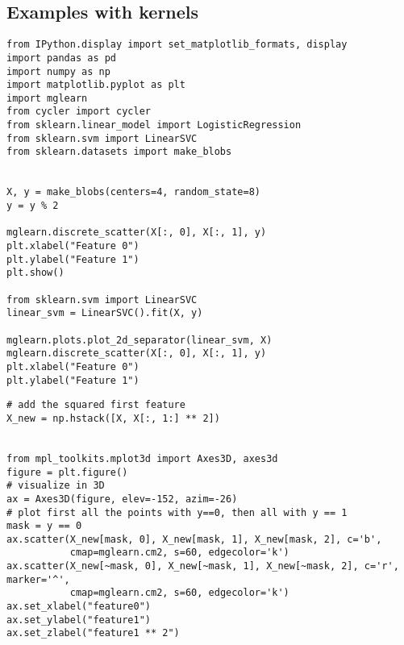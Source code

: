 \documentclass[%
oneside,                 %
final,                   %
10pt]{article}
\begin{document}
\subsection*{Examples with kernels}

\begin{verbatim}
from IPython.display import set_matplotlib_formats, display
import pandas as pd
import numpy as np
import matplotlib.pyplot as plt
import mglearn
from cycler import cycler
from sklearn.linear_model import LogisticRegression
from sklearn.svm import LinearSVC
from sklearn.datasets import make_blobs


X, y = make_blobs(centers=4, random_state=8)
y = y % 2

mglearn.discrete_scatter(X[:, 0], X[:, 1], y)
plt.xlabel("Feature 0")
plt.ylabel("Feature 1")
plt.show()

from sklearn.svm import LinearSVC
linear_svm = LinearSVC().fit(X, y)

mglearn.plots.plot_2d_separator(linear_svm, X)
mglearn.discrete_scatter(X[:, 0], X[:, 1], y)
plt.xlabel("Feature 0")
plt.ylabel("Feature 1")
\end{verbatim}

\begin{verbatim}
# add the squared first feature
X_new = np.hstack([X, X[:, 1:] ** 2])


from mpl_toolkits.mplot3d import Axes3D, axes3d
figure = plt.figure()
# visualize in 3D
ax = Axes3D(figure, elev=-152, azim=-26)
# plot first all the points with y==0, then all with y == 1
mask = y == 0
ax.scatter(X_new[mask, 0], X_new[mask, 1], X_new[mask, 2], c='b',
           cmap=mglearn.cm2, s=60, edgecolor='k')
ax.scatter(X_new[~mask, 0], X_new[~mask, 1], X_new[~mask, 2], c='r', marker='^',
           cmap=mglearn.cm2, s=60, edgecolor='k')
ax.set_xlabel("feature0")
ax.set_ylabel("feature1")
ax.set_zlabel("feature1 ** 2")
\end{verbatim}
\end{document}
